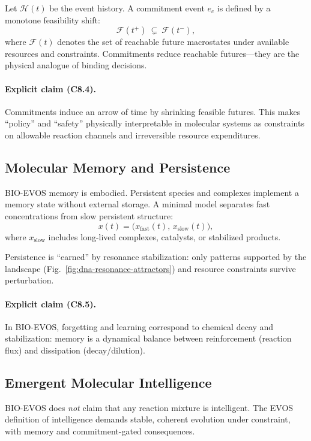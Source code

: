 \documentclass[11pt]{article}
\begin{document}
Let $\mathcal{H}(t)$ be the event history. A commitment event $e_c$ is defined by a
monotone feasibility shift:
\[
\mathcal{F}(t^+)\ \subsetneq\ \mathcal{F}(t^-),
\]
where $\mathcal{F}(t)$ denotes the set of reachable future macrostates under available
resources and constraints. Commitments reduce reachable futures---they are the physical
analogue of binding decisions.

\paragraph{Explicit claim (C8.4).}
Commitments induce an arrow of time by shrinking feasible futures. This makes ``policy''
and ``safety'' physically interpretable in molecular systems as constraints on allowable
reaction channels and irreversible resource expenditures.

\subsection{Molecular Memory and Persistence}
\label{sec:molecular-memory}

BIO-EVOS memory is embodied. Persistent species and complexes implement a memory state
without external storage. A minimal model separates fast concentrations from slow
persistent structure:
\[
x(t) = \big(x_{\text{fast}}(t),\, x_{\text{slow}}(t)\big),
\]
where $x_{\text{slow}}$ includes long-lived complexes, catalysts, or stabilized products.

Persistence is ``earned'' by resonance stabilization: only patterns supported by the
landscape (Fig.~\ref{fig:dna-resonance-attractors}) and resource constraints survive
perturbation.

\paragraph{Explicit claim (C8.5).}
In BIO-EVOS, forgetting and learning correspond to chemical decay and stabilization:
memory is a dynamical balance between reinforcement (reaction flux) and dissipation
(decay/dilution).

\subsection{Emergent Molecular Intelligence}
\label{sec:emergent-molecular-intel}

BIO-EVOS does \emph{not} claim that any reaction mixture is intelligent. The EVOS
definition of intelligence demands stable, coherent evolution under constraint, with
memory and commitment-gated consequences.
\end{document}
